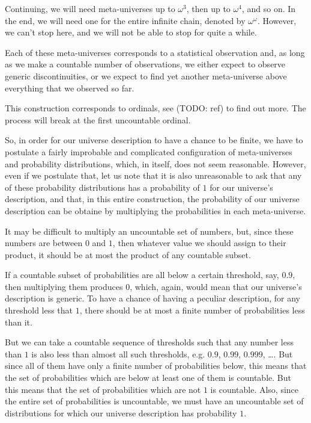 \documentclass[a4paper
]{article}
\begin{document}
Continuing, we will need meta-universes up to $\omega^3$, then up to
$\omega^4$, and so on.
In the end, we will need one for the entire
infinite chain, denoted by $\omega^\omega$.
However, we can't stop here, and we will not be able to stop for quite a while.

Each of these meta-universes corresponds to a statistical observation and,
as long as we make a countable number of observations, we either expect to
observe generic discontinuities, or we expect to find yet another meta-universe
above everything that we observed so far.

This construction corresponds to ordinals, see (TODO: ref) to find out more.
The process will break at the first uncountable ordinal.

So, in order for our universe description to have a chance to be finite,
we have to postulate a fairly improbable and complicated configuration
of meta-universes and probability distributions, which,
in itself, does not seem reasonable.
However, even if we postulate that, let us note that it is also unreasonable
to ask that any of these probability distributions has a probability of $1$
for our universe's description, and that, in this entire construction,
the probability of our universe description can be obtaine by multiplying the
probabilities in each meta-universe.

It may be difficult to multiply an uncountable set of numbers, but,
since these numbers are between $0$ and $1$, then whatever value we should
assign to their product,
it should be at most the product of any countable subset.

If a countable subset of probabilities are all below a certain threshold,
say, $0.9$, then multiplying them produces $0$, which, again, would mean
that our universe's description is generic. To have a chance of having
a peculiar description, for any threshold less that $1$, there should be at
most a finite number of probabilities less than it.

But we can take a countable sequence of thresholds such that any number less
than $1$ is also less than almost all such thresholds, e.g.
$0.9$, $0.99$, $0.999$, \dots. But since all of them have only a finite number
of probabilities below, this means that the set of probabilities which are
below at least one of them is countable. But this means that the set of
probabilities which are not $1$ is countable. Also, since the entire set of
probabilities is uncountable, we must have an uncountable set of distributions
for which our universe description has probability $1$.
\end{document}
